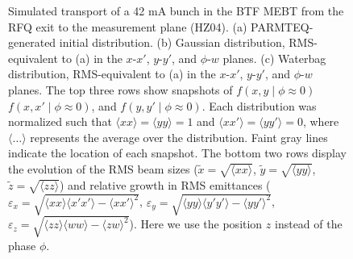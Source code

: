 \documentclass[%
 reprint,
 amsmath,amssymb,
 aps,
prstab,
]{revtex4-2}
\begin{document}
\begin{figure}
{        \label{fig:sim_b}%
    }%
    \hfill
    \caption{Simulated transport of a 42 mA bunch in the BTF MEBT from the RFQ exit to the measurement plane (HZ04). (a) PARMTEQ-generated initial distribution. (b) Gaussian distribution, RMS-equivalent to (a) in the $x$-$x'$, $y$-$y'$, and $\phi$-$w$ planes. (c) Waterbag distribution, RMS-equivalent to (a) in the $x$-$x'$, $y$-$y'$, and $\phi$-$w$ planes. The top three rows show snapshots of $f(x, y \mid \phi{\approx}0)$ $f(x, x' \mid \phi{\approx}0)$, and $f(y, y' \mid \phi{\approx}0)$. Each distribution was normalized such that $\langle{xx}\rangle = \langle{yy}\rangle = 1$ and $\langle{xx'}\rangle = \langle{yy'}\rangle = 0$, where $\langle\dots\rangle$ represents the average over the distribution. Faint gray lines indicate the location of each snapshot. The bottom two rows display the evolution of the RMS beam sizes ($\tilde{x} = \sqrt{\langle{xx}\rangle}$, $\tilde{y} = \sqrt{\langle{yy}\rangle}$, $\tilde{z} = \sqrt{\langle{zz}\rangle}$) and relative growth in RMS emittances ($\varepsilon_x = \sqrt{\langle{xx}\rangle\langle{x'x'}\rangle - \langle{xx'}\rangle^2}$, $\varepsilon_y = \sqrt{\langle{yy}\rangle\langle{y'y'}\rangle - \langle{yy'}\rangle^2}$, $\varepsilon_z = \sqrt{\langle{zz}\rangle\langle{ww}\rangle - \langle{zw}\rangle^2}$). Here we use the position $z$ instead of the phase $\phi$.}
    \label{fig:sim}
\end{figure}
%
\end{document}
